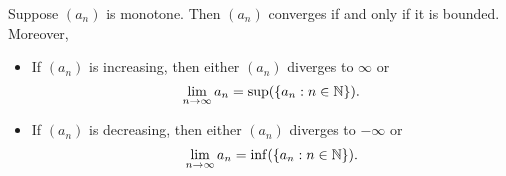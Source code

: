 \begin{theorem}
  Suppose $(a_n)$ is monotone. Then $(a_n)$ converges if and only if
  it is bounded. Moreover,
  \begin{itemize}
    \item If $(a_n)$ is increasing, then either $(a_n)$ diverges to
      $\infty$ or
      \[ \lim_{n \to \infty} a_n = \sup(\{ a_n : n \in \mathbb N \}). \]
    \item If $(a_n)$ is decreasing, then either $(a_n)$ diverges to
      $-\infty$ or
      \[ \lim_{n \to \infty} a_n = \inf(\{ a_n : n \in \mathbb N \}). \]
  \end{itemize}
\end{theorem}

